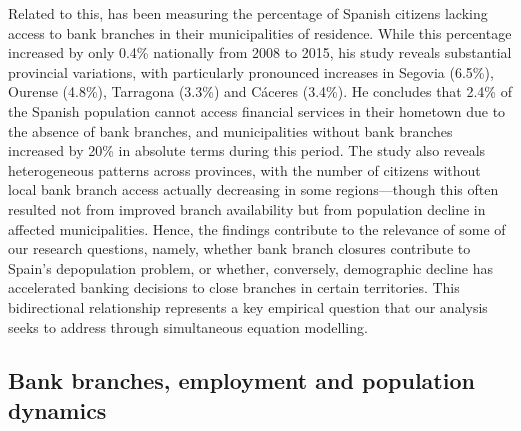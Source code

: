 \documentclass[a4paper,11pt,oneside]{article}
\begin{document}
Related to this, \cite{maudos2017bank} has been measuring the percentage of Spanish citizens lacking access to bank branches in their municipalities of residence. While this percentage increased by only 0.4\% nationally from 2008 to 2015, his study reveals substantial provincial variations, with particularly pronounced increases in Segovia (6.5\%), Ourense (4.8\%), Tarragona (3.3\%) and Cáceres (3.4\%). He concludes that 2.4\% of the Spanish population cannot access financial services in their hometown due to the absence of bank branches, and municipalities without bank branches increased by 20\% in absolute terms during this period. The study also reveals heterogeneous patterns across provinces, with the number of citizens without local bank branch access actually decreasing in some regions---though this often resulted not from improved branch availability but from population decline in affected municipalities. Hence, the findings contribute to the relevance of some of our research questions, namely, whether bank branch closures contribute to Spain's depopulation problem, or whether, conversely, demographic decline has accelerated banking decisions to close branches in certain territories. This bidirectional relationship represents a key empirical question that our analysis seeks to address through simultaneous equation modelling.



\color{black}

\subsection{Bank branches, employment and population dynamics}


\end{document}
